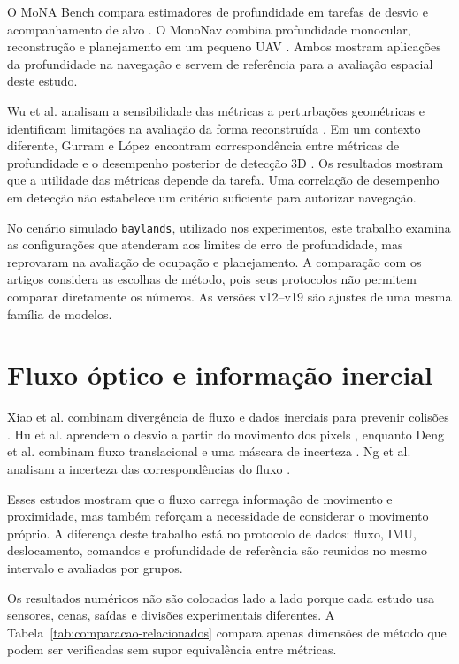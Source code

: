 O MoNA Bench compara estimadores de profundidade em tarefas de desvio e acompanhamento de alvo \cite{Pan2024MoNA}. O MonoNav combina profundidade monocular, reconstrução e planejamento em um pequeno UAV \cite{Simon2024MonoNav}. Ambos mostram aplicações da profundidade na navegação e servem de referência para a avaliação espacial deste estudo.

Wu et al. analisam a sensibilidade das métricas a perturbações geométricas e identificam limitações na avaliação da forma reconstruída \cite{Wu2025DepthEvaluation}. Em um contexto diferente, Gurram e López encontram correspondência entre métricas de profundidade e o desempenho posterior de detecção 3D \cite{Gurram2023DepthMetrics}. Os resultados mostram que a utilidade das métricas depende da tarefa. Uma correlação de desempenho em detecção não estabelece um critério suficiente para autorizar navegação.

No cenário simulado \texttt{baylands}, utilizado nos experimentos, este trabalho examina as configurações que atenderam aos limites de erro de profundidade, mas reprovaram na avaliação de ocupação e planejamento. A comparação com os artigos considera as escolhas de método, pois seus protocolos não permitem comparar diretamente os números. As versões v12--v19 são ajustes de uma mesma família de modelos.

\section{Fluxo óptico e informação inercial}

Xiao et al. combinam divergência de fluxo e dados inerciais para prevenir colisões \cite{Xiao2021}. Hu et al. aprendem o desvio a partir do movimento dos pixels \cite{PixelMotion2025}, enquanto Deng et al. combinam fluxo translacional e uma máscara de incerteza \cite{Deng2026}. Ng et al. analisam a incerteza das correspondências do fluxo \cite{Estimation2109}.

Esses estudos mostram que o fluxo carrega informação de movimento e proximidade, mas também reforçam a necessidade de considerar o movimento próprio. A diferença deste trabalho está no protocolo de dados: fluxo, IMU, deslocamento, comandos e profundidade de referência são reunidos no mesmo intervalo e avaliados por grupos.

Os resultados numéricos não são colocados lado a lado porque cada estudo usa sensores, cenas, saídas e divisões experimentais diferentes. A Tabela~\ref{tab:comparacao-relacionados} compara apenas dimensões de método que podem ser verificadas sem supor equivalência entre métricas.


